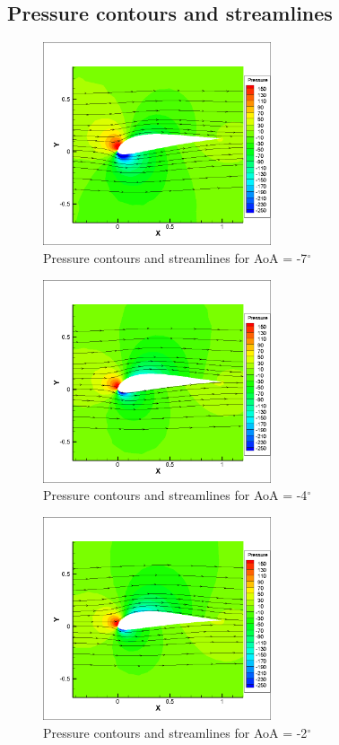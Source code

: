 \subsection{Pressure contours and streamlines}

\begin{figure}[H]
	\centering
	\includegraphics[width=0.6\textwidth]{tecplot_stuff/cont_stream_-7.png}
	\caption{Pressure contours and streamlines for AoA = -7$^\circ$}
\label{fig:cont_stream_-7}
\end{figure}

\begin{figure}[H]
	\centering
	\includegraphics[width=0.6\textwidth]{tecplot_stuff/cont_stream_-4.png}
	\caption{Pressure contours and streamlines for AoA = -4$^\circ$}
\label{fig:cont_stream_-4}
\end{figure}


\begin{figure}[H]
	\centering
	\includegraphics[width=0.6\textwidth]{tecplot_stuff/cont_stream_-2.png}
	\caption{Pressure contours and streamlines for AoA = -2$^\circ$}
\label{fig:cont_stream_-2}
\end{figure}


